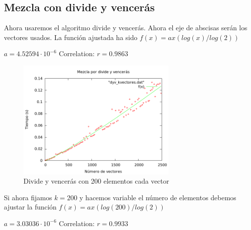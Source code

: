 \subsection{Mezcla con divide y vencer\'as}
\begin{frame}
	\begin{block}
	Ahora usaremos el algoritmo divide y vencerás.
	Ahora el eje de abscisas serán los vectores usados.
	La funci\'on ajustada ha sido $f(x) = ax(log(x)/log(2))$

	\begin{center}	
	$a               = 4.52594\cdot 10^{-6}$
	Correlation:  $r = 0.9863$
	\end{center}
	\end{block}
\end{frame}

\begin{frame}[Imagen]
	\begin{block}
	
	\begin{figure}[h] 
	\centering
	\includegraphics[width=0.7\textwidth]{../Obligatorio/Graficas/dyv_kvectores.png}
	\caption{Divide y vencerás con 200 elementos cada vector} 
	\end{figure}
	
	\end{block}
\end{frame}

\begin{frame}
	\begin{block}
	
	Si ahora fijamos $k=200$ y hacemos variable el n\'umero de elementos debemos ajustar 			la funci\'on $f(x) = ax(log(200)/log(2))$

	\begin{center}
	$a               = 3.03036\cdot 10^{-6}$
	Correlation:  $r = 0.9933$
	\end{center}
	\end{block}
\end{frame}


